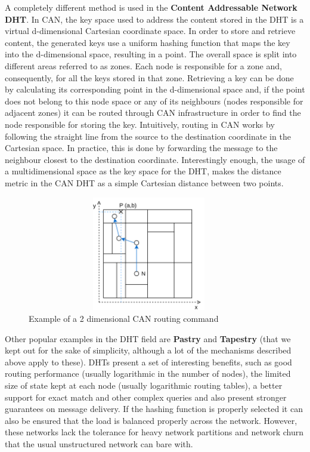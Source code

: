 A completely different method is used in the \textbf{Content Addressable
Network DHT}\cite{Ratnasamy2001a}. In CAN, the key space used to
address the content stored in the DHT is a virtual d-dimensional
Cartesian coordinate space. In order to store and retrieve content, the
generated keys use a uniform hashing function that maps the key into the
d-dimensional space, resulting in a point. The overall space is split
into different areas referred to as zones. Each node is responsible for
a zone and, consequently, for all the keys stored in that zone.
Retrieving a key can be done by calculating its corresponding point in
the d-dimensional space and, if the point does not belong to this node
space or any of its neighbours (nodes responsible for adjacent zones) it
can be routed through CAN infrastructure in order to find the node
responsible for storing the key. Intuitively, routing in CAN works by
following the straight line from the source to the destination
coordinate in the Cartesian space. In practice, this is done by
forwarding the message to the neighbour closest to the destination
coordinate. Interestingly enough, the usage of a multidimensional space
as the key space for the DHT, makes the distance metric in the CAN DHT
as a simple Cartesian distance between two points.

\begin{figure}[hb!]
  \centering
  \includegraphics[max height=5cm,max width=0.95\textwidth]{img/can.png}
  \caption{Example of a 2 dimensional CAN routing command}
  \label{fig:can}
\end{figure}

Other popular examples in the DHT field are \textbf{Pastry} \cite{Rowstron2001} and
\textbf{Tapestry} \cite{Zhao2006} (that we kept out for the sake of simplicity, although
a lot of the mechanisms described above apply to these). DHTs present a
set of interesting benefits, such as good routing performance (usually
logarithmic in the number of nodes), the limited size of state kept at
each node (usually logarithmic routing tables), a better support for
exact match and other complex queries and also present stronger
guarantees on message delivery. If the hashing function is properly
selected it can also be ensured that the load is balanced properly
across the network. However, these networks lack the tolerance for heavy
network partitions and network churn that the usual unstructured network
can bare with.
\bigskip


